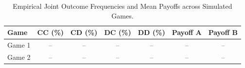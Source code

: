 \begin{table}[htbp]
    \centering
    \scriptsize
    \caption{Empirical Joint Outcome Frequencies and Mean Payoffs across Simulated Games.}
    \label{tab:mallm_outcomes}
    \begin{tabular}{lcccccc}
        \toprule
        \textbf{Game} & \textbf{CC (\%)} & \textbf{CD (\%)} & \textbf{DC (\%)} & \textbf{DD (\%)} & \textbf{Payoff A} & \textbf{Payoff B} \\
        \midrule
        Game 1 & -- & -- & -- & -- & -- & -- \\
        Game 2 & -- & -- & -- & -- & -- & -- \\
        \bottomrule
    \end{tabular}
\end{table}
